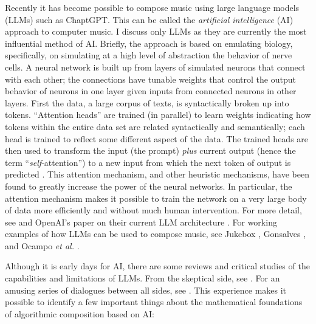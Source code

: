 \documentclass[11pt,papersize=a4]{scrartcl}
\begin{document}
Recently it has become possible to compose music using large language models (LLMs) such as ChaptGPT. This can be called the \emph{artificial intelligence} (AI) approach to computer music. I discuss only LLMs as they are currently the most influential method of AI. Briefly, the approach is based on emulating biology, specifically, on simulating at a high level of abstraction the behavior of nerve cells. A neural network is built up from layers of simulated neurons that connect with each other; the connections have tunable weights that control the output behavior of neurons in one layer given inputs from connected neurons in other layers. First the data, a large corpus of texts, is syntactically broken up into tokens. ``Attention heads'' are trained (in parallel) to learn weights indicating how tokens within the entire data set are related syntactically and semantically; each head is trained to reflect some different aspect of the data. The trained heads are then used to transform the input (the prompt) \emph{plus} current output (hence the term ``\emph{self}-attention'') to a new input from which the next token of output is predicted \parencite{vaswani2017attention}. This attention mechanism, and other heuristic mechanisms, have been found to greatly increase the power of the neural networks. In particular, the attention mechanism makes it possible to train the network on a very large body of data more efficiently and without much human intervention. For more detail, see \parencite{zhang2023complete} and OpenAI's paper on their current LLM architecture \parencite{openai2023gpt4}. For working examples of how LLMs can be used to compose music, see Jukebox \parencite{openai2023jukebox}, Gonsalves \parencite{aitunes}, and Ocampo \emph{et al.} \parencite{ocampo2023using}.

Although it is early days for AI, there are some reviews and critical studies of the capabilities and limitations of LLMs. From the skeptical side, see \parencite{dale2021gpt}. For an amusing series of dialogues between all sides, see \parencite{shtetl}. This experience makes it possible to identify a few important things about the mathematical foundations of algorithmic composition based on AI:
\end{document}

